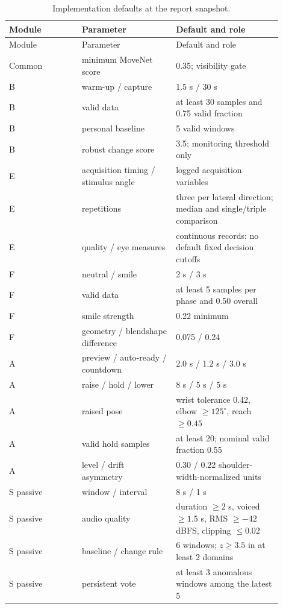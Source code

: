 \documentclass[11pt,a4paper]{article}
\begin{document}
\begin{longtable}{p{0.24\linewidth}p{0.31\linewidth}p{0.35\linewidth}}
\caption{Implementation defaults at the report snapshot.}\\
\toprule
Module & Parameter & Default and role \\
\midrule
\endfirsthead
\toprule
Module & Parameter & Default and role \\
\midrule
\endhead
Common & minimum MoveNet score & 0.35; visibility gate \\
B & warm-up / capture & 1.5 s / 30 s \\
B & valid data & at least 30 samples and 0.75 valid fraction \\
B & personal baseline & 5 valid windows \\
B & robust change score & 3.5; monitoring threshold only \\
E & acquisition timing / stimulus angle & logged acquisition variables \\
E & repetitions & three per lateral direction; median and single/triple comparison \\
E & quality / eye measures & continuous records; no default fixed decision cutoffs \\
F & neutral / smile & 2 s / 3 s \\
F & valid data & at least 5 samples per phase and 0.50 overall \\
F & smile strength & 0.22 minimum \\
F & geometry / blendshape difference & 0.075 / 0.24 \\
A & preview / auto-ready / countdown & 2.0 s / 1.2 s / 3.0 s \\
A & raise / hold / lower & 8 s / 5 s / 5 s \\
A & raised pose & wrist tolerance 0.42, elbow $\geq125^{\circ}$, reach $\geq0.45$ \\
A & valid hold samples & at least 20; nominal valid fraction 0.55 \\
A & level / drift asymmetry & 0.30 / 0.22 shoulder-width-normalized units \\
S passive & window / interval & 8 s / 1 s \\
S passive & audio quality & duration $\geq2$ s, voiced $\geq1.5$ s, RMS $\geq-42$ dBFS, clipping $\leq0.02$ \\
S passive & baseline / change rule & 6 windows; $z\geq3.5$ in at least 2 domains \\
S passive & persistent vote & at least 3 anomalous windows among the latest 5 \\

\end{longtable}
\end{document}
